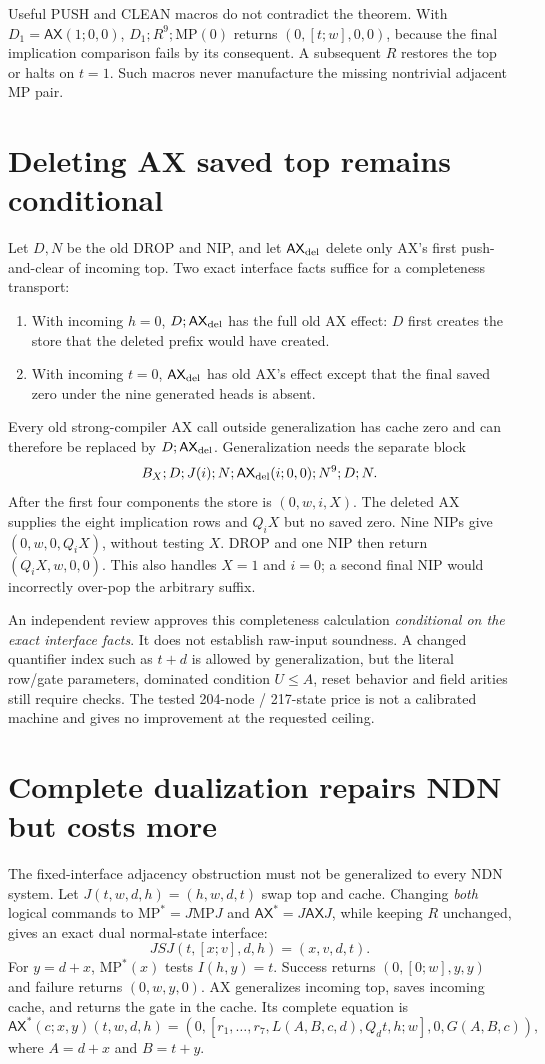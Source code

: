 \documentclass[11pt]{article}
\newcommand{\AX}{\mathsf{AX}}
\begin{document}
Useful PUSH and CLEAN macros do not contradict the theorem. With $D_1=\AX(1;0,0)$, $D_1;R^9;\mathrm{MP}(0)$ returns $(0,[t;w],0,0)$, because the final implication comparison fails by its consequent. A subsequent $R$ restores the top or halts on $t=1$. Such macros never manufacture the missing nontrivial adjacent MP pair.

\section{Deleting AX saved top remains conditional}
Let $D,N$ be the old DROP and NIP, and let $\AX_{\rm del}$ delete only AX's first push-and-clear of incoming top. Two exact interface facts suffice for a completeness transport:
\begin{enumerate}
\item With incoming $h=0$, $D;\AX_{\rm del}$ has the full old AX effect: $D$ first creates the store that the deleted prefix would have created.
\item With incoming $t=0$, $\AX_{\rm del}$ has old AX's effect except that the final saved zero under the nine generated heads is absent.
\end{enumerate}
Every old strong-compiler AX call outside generalization has cache zero and can therefore be replaced by $D;\AX_{\rm del}$. Generalization needs the separate block
\[
 B_X;D;J(i);N;\AX_{\rm del}(i;0,0);N^9;D;N.
\]
After the first four components the store is $(0,w,i,X)$. The deleted AX supplies the eight implication rows and $Q_iX$ but no saved zero. Nine NIPs give $(0,w,0,Q_iX)$, without testing $X$. DROP and one NIP then return $(Q_iX,w,0,0)$. This also handles $X=1$ and $i=0$; a second final NIP would incorrectly over-pop the arbitrary suffix.

An independent review approves this completeness calculation \emph{conditional on the exact interface facts}. It does not establish raw-input soundness. A changed quantifier index such as $t+d$ is allowed by generalization, but the literal row/gate parameters, dominated condition $U\le A$, reset behavior and field arities still require checks. The tested 204-node / 217-state price is not a calibrated machine and gives no improvement at the requested ceiling.

\section{Complete dualization repairs NDN but costs more}
The fixed-interface adjacency obstruction must not be generalized to every NDN system. Let $J(t,w,d,h)=(h,w,d,t)$ swap top and cache. Changing \emph{both} logical commands to $\mathrm{MP}^{*}=J\mathrm{MP}J$ and $\AX^{*}=J\AX J$, while keeping $R$ unchanged, gives an exact dual normal-state interface:
\[
 J S J(t,[x;v],d,h)=(x,v,d,t).
\]
For $y=d+x$, $\mathrm{MP}^{*}(x)$ tests $I(h,y)=t$. Success returns $(0,[0;w],y,y)$ and failure returns $(0,w,y,0)$. AX generalizes incoming top, saves incoming cache, and returns the gate in the cache. Its complete equation is
\[
 \AX^{*}(c;x,y)(t,w,d,h)=
 (0,[r_1,\ldots,r_7,L(A,B,c,d),Q_dt,h;w],0,G(A,B,c)),
\]
where $A=d+x$ and $B=t+y$.
\end{document}
